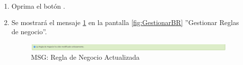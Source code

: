 \begin{enumerate}
			\item Oprima el botón \IUAceptar.
			
			\item Se mostrará el mensaje \ref{fig:BRModificada} en la pantalla \ref{fig:GestionarBR} ''Gestionar Reglas de negocio''.
			
			\begin{figure}[htbp!]
				\begin{center}
					\includegraphics[scale=0.5]{roles/lider/reglasNegocio/pantallas/IU8-2MSG1}
					\caption{MSG: Regla de Negocio Actualizada}
					\label{fig:BRModificada}
				\end{center}
			\end{figure}
			\end{enumerate}